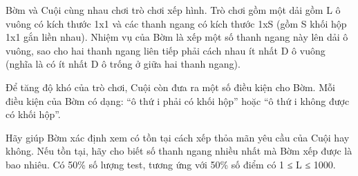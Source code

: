 Bờm và Cuội cùng nhau chơi trò chơi xếp hình. Trò chơi gồm một dải gồm L ô vuông có kích thước 1x1 và các thanh ngang có kích thước 1xS (gồm S khối hộp 1x1 gắn liền nhau). Nhiệm vụ của Bờm là xếp một số thanh ngang này lên dải ô vuông, sao cho hai thanh ngang liên tiếp phải cách nhau ít nhất D ô vuông (nghĩa là có ít nhất D ô trống ở giữa hai thanh ngang).

Để tăng độ khó của trò chơi, Cuội còn đưa ra một số điều kiện cho Bờm. Mỗi điều kiện của Bờm có dạng: “ô thứ i phải có khối hộp” hoặc “ô thứ i không được có khối hộp”.

Hãy giúp Bờm xác định xem có tồn tại cách xếp thỏa mãn yêu cầu của Cuội hay không. Nếu tồn tại, hãy cho biết số thanh ngang nhiều nhất mà Bờm xếp được là bao nhiêu.
Có 50\% số lượng test, tương ứng với 50\% số điểm có 1 ≤ L ≤ 1000.